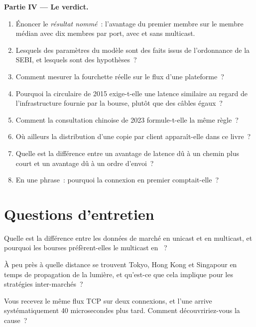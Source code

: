 \begin{problem}
\medskip\noindent\textbf{Partie IV --- Le verdict.}
\begin{enumerate}[resume]
\item Énoncer le \emph{résultat nommé}~: l'avantage du premier membre sur le membre médian avec dix membres par port, avec et sans multicast.
\item Lesquels des paramètres du modèle sont des faits issus de l'ordonnance de la SEBI, et lesquels sont des hypothèses~?
\item Comment mesurer la fourchette réelle sur le flux d'une plateforme~?
\item Pourquoi la circulaire de 2015 exige-t-elle une latence similaire au regard de l'infrastructure fournie par la bourse, plutôt que des câbles égaux~?
\item Comment la consultation chinoise de 2023 formule-t-elle la même règle~?
\item Où ailleurs la distribution d'une copie par client apparaît-elle dans ce livre~?
\item Quelle est la différence entre un avantage de latence dû à un chemin plus court et un avantage dû à un ordre d'envoi~?
\item En une phrase~: pourquoi la connexion en premier comptait-elle~?
\end{enumerate}
\end{problem}

\section{Questions d'entretien}

\begin{interviewq}\label{iq:nw:the-asia-pacific-map:1}
Quelle est la différence entre les données de marché en unicast et en multicast, et pourquoi les bourses préfèrent-elles le multicast en ~?
\end{interviewq}

\begin{interviewq}\label{iq:nw:the-asia-pacific-map:2}
À peu près à quelle distance se trouvent Tokyo, Hong Kong et Singapour en temps de propagation de la lumière, et qu'est-ce que cela implique pour les stratégies inter-marchés~?
\end{interviewq}

\begin{interviewq}\label{iq:nw:the-asia-pacific-map:3}
Vous recevez le même flux TCP sur deux connexions, et l'une arrive systématiquement 40 microsecondes plus tard. Comment découvririez-vous la cause~?
\end{interviewq}

